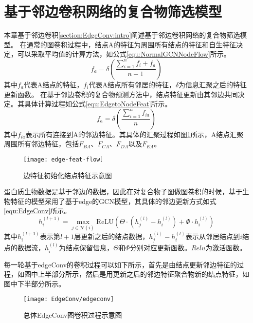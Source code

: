 \section{基于邻边卷积网络的复合物筛选模型}
\label{section:EdgeConv:detail}



本章基于邻边卷积\ref{section:EdgeConv:intro}阐述基于邻边卷积网络的复合物筛选模型。
在通常的图卷积过程中，结点A的特征为周围所有结点的特征和自生特征决定，可以采取平均值的计算方法，如公式\ref{equ:NormalGCNNodeFlow}所示。
\begin{equation}
    \label{equ:NormalGCNNodeFlow}
    f_a=\delta (\frac{\sum_{i = 1}^{n}f_i+f_a}{n+1})
\end{equation}
其中$f_a$代表A结点的特征，$f_i$代表A结点所有邻居的特征，$\delta$为信息汇聚之后的特征更新函数。
在基于邻边卷积的复合物预测方法中，结点特征更新由其邻边共同决定。其具体计算过程如公式\ref{equ:EdgetoNodeFeat}所示。
\begin{equation}
    \label{equ:EdgetoNodeFeat}
    f_a=\delta (\frac{\sum_{i = 1}^{n}f_{ia}}{n})
\end{equation}
其中$f_{ia}$表示所有连接到A的邻边特征。其具体的汇聚过程如图\ref{fig:edge-feat-flow}所示，A结点汇聚周围所有邻边特征，包括$F_{BA}$、$F_{CA}$、$F_{DA}$以及$F_{EA}$。

\begin{figure}[htbp]
    \centering
    \texttt{[image: edge-feat-flow]}
    \caption{边特征初始化结点特征示意图}
    \label{fig:edge-feat-flow}
\end{figure}

蛋白质生物数据是基于邻边的数据，因此在对复合物子图做图卷积的时候，基于生物特征的模型采用了基于edge的GCN模型\cite{wang_dynamic_2019}，其具体的邻边更新方式如式\ref{equ:EdgeConv}所示。
\begin{equation}
    \label{equ:EdgeConv}
    h_i^{(l+1)} = \max_{j \in \mathcal{N}(i)} \mathrm{ReLU}(
    \Theta \cdot (h_j^{(l)} - h_i^{(l)}) + \Phi \cdot h_i^{(l)})
\end{equation}
其中$h_i^{(l+1)}$表示第$l+1$层更新之后的结点数据，$h_j^{(l)} - h_i^{(l)}$表示从邻居结点到$i$结点的数据流，$h_i^{(l)}$为结点保留信息，$\Theta$和$\Phi$分别对应更新函数。$Relu$为激活函数。

每一轮基于edgeConv的卷积过程可以如下所示，首先是由结点更新邻边特征的过程，如图中上半部分所示，然后是用更新之后的邻边特征聚合物新的结点特征，如图中下半部分所示。

\begin{figure}[htbp]
    \centering
    \texttt{[image: EdgeConv/edgeconv]}
    \caption{总体EdgeConv图卷积过程示意图}
    \label{fig:EdgeConv/edgeconv}
\end{figure}

